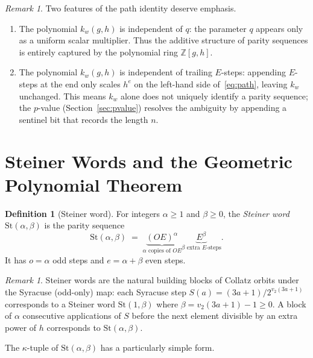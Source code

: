 \documentclass[12pt]{article}
\theoremstyle{definition}
\newtheorem{definition}[theorem]{Definition}
\theoremstyle{remark}
\newtheorem{remark}[theorem]{Remark}
\newcommand{\ZZ}{\mathbb{Z}}
\newcommand{\St}{\mathrm{St}}
\newcommand{\kpoly}{k}
\begin{document}
\begin{remark}
\label{rem:trailing}
Two features of the path identity deserve emphasis.
\begin{enumerate}
  \item The polynomial $\kpoly_w(g,h)$ is independent of $q$: the parameter
        $q$ appears only as a uniform scalar multiplier.  Thus the additive
        structure of parity sequences is entirely captured by the polynomial
        ring $\ZZ[g,h]$.
  \item The polynomial $\kpoly_w(g,h)$ is independent of trailing $E$-steps:
        appending $E$-steps at the end only scales $h^e$ on the left-hand
        side of~\eqref{eq:path}, leaving $\kpoly_w$ unchanged.  This means
        $\kpoly_w$ alone does not uniquely identify a parity sequence; the
        $p$-value (Section~\ref{sec:pvalue}) resolves the ambiguity by
        appending a sentinel bit that records the length $n$.
\end{enumerate}
\end{remark}

\section{Steiner Words and the Geometric Polynomial Theorem}
\label{sec:steiner}

\begin{definition}[Steiner word]
\label{def:steiner}
For integers $\alpha \geq 1$ and $\beta \geq 0$, the \emph{Steiner word}
$\St(\alpha, \beta)$ is the parity sequence
\[
  \St(\alpha,\beta) \;=\; \underbrace{(OE)^{\alpha}}_{\alpha \text{ copies of } OE}
  \underbrace{E^\beta}_{\beta \text{ extra } E\text{-steps}}.
\]
It has $o = \alpha$ odd steps and $e = \alpha + \beta$ even steps.
\end{definition}

\begin{remark}
Steiner words are the natural building blocks of Collatz orbits under the
Syracuse (odd-only) map: each Syracuse step $S(a) = (3a+1)/2^{v_2(3a+1)}$
corresponds to a Steiner word $\St(1,\beta)$ where $\beta = v_2(3a+1) - 1
\geq 0$.  A block of $\alpha$ consecutive applications of $S$ before the next
element divisible by an extra power of $h$ corresponds to $\St(\alpha,\beta)$.
\end{remark}

The $\kappa$-tuple of $\St(\alpha,\beta)$ has a particularly simple form.
\end{document}
